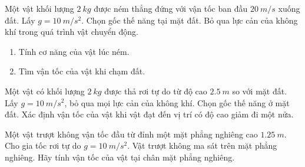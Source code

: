 \begin{ex}
Một vật khối lượng $\SI{2}{kg}$ được ném thẳng đứng với vận tốc ban đầu $\SI{20}{m/s}$ xuống đất. Lấy $g=\SI{10}{m/s^2}$. Chọn gốc thế năng tại mặt đất. Bỏ qua lực cản của không khí trong quá trình vật chuyển động.
\begin{enumerate}[label=\alph*)]
	\item Tính cơ năng của vật lúc ném.
	\item Tìm vận tốc của vật khi chạm đất.
\end{enumerate}	
\end{ex}
\begin{ex}
	Một vật có khối lượng $\SI{2}{kg}$ được thả rơi tự do từ độ cao $\SI{2.5}{m}$ so với mặt đất. Lấy $g=\SI{10}{m/s^2}$, bỏ qua mọi lực cản của không khí. Chọn gốc thế năng ở mặt đất. Xác định vận tốc của vật khi vật đạt đến vị trí có độ cao giảm đi một nửa.
\end{ex}
\begin{ex}
	Một vật trượt không vận tốc đầu từ đỉnh một mặt phẳng nghiêng cao $\SI{1.25}{m}$. Cho gia tốc rơi tự do $g=\SI{10}{m/s^2}$. Vật trượt không ma sát trên mặt phẳng nghiêng. Hãy tính vận tốc của vật tại chân mặt phẳng nghiêng.	
\end{ex}
